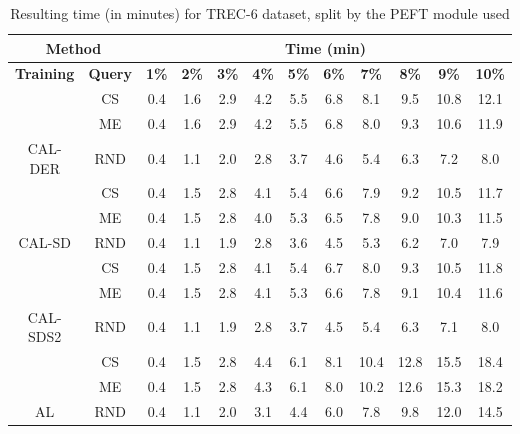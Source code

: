 \begin{table}[htbp]
\begin{subtable}{\linewidth}
\begin{tabular}{c|c|cccccccccc}
\toprule
\multicolumn{2}{c|}{\textbf{Method}} & \multicolumn{10}{c}{\textbf{Time (min)}} \\
\midrule
\textbf{Training} & \textbf{Query} & \textbf{1\%} & \textbf{2\%} & \textbf{3\%} & \textbf{4\%} & \textbf{5\%} & \textbf{6\%} & \textbf{7\%} & \textbf{8\%} & \textbf{9\%} & \textbf{10\%}\\
\midrule
 & CS & 0.4 & 1.6 & 2.9 & 4.2 & 5.5 & 6.8 & 8.1 & 9.5 & 10.8 & 12.1\\

 & ME & 0.4 & 1.6 & 2.9 & 4.2 & 5.5 & 6.8 & 8.0 & 9.3 & 10.6 & 11.9\\

\multirow{-3}{*}{\raggedright\arraybackslash CAL-DER} & RND & 0.4 & 1.1 & 2.0 & 2.8 & 3.7 & 4.6 & 5.4 & 6.3 & 7.2 & 8.0\\
\midrule
 & CS & 0.4 & 1.5 & 2.8 & 4.1 & 5.4 & 6.6 & 7.9 & 9.2 & 10.5 & 11.7\\

 & ME & 0.4 & 1.5 & 2.8 & 4.0 & 5.3 & 6.5 & 7.8 & 9.0 & 10.3 & 11.5\\

\multirow{-3}{*}{\raggedright\arraybackslash CAL-SD} & RND & 0.4 & 1.1 & 1.9 & 2.8 & 3.6 & 4.5 & 5.3 & 6.2 & 7.0 & 7.9\\
\midrule
 & CS & 0.4 & 1.5 & 2.8 & 4.1 & 5.4 & 6.7 & 8.0 & 9.3 & 10.5 & 11.8\\

 & ME & 0.4 & 1.5 & 2.8 & 4.1 & 5.3 & 6.6 & 7.8 & 9.1 & 10.4 & 11.6\\

\multirow{-3}{*}{\raggedright\arraybackslash CAL-SDS2} & RND & 0.4 & 1.1 & 1.9 & 2.8 & 3.7 & 4.5 & 5.4 & 6.3 & 7.1 & 8.0\\
\midrule
 & CS & 0.4 & 1.5 & 2.8 & 4.4 & 6.1 & 8.1 & 10.4 & 12.8 & 15.5 & 18.4\\

 & ME & 0.4 & 1.5 & 2.8 & 4.3 & 6.1 & 8.0 & 10.2 & 12.6 & 15.3 & 18.2\\

\multirow{-3}{*}{\raggedright\arraybackslash AL} & RND & 0.4 & 1.1 & 2.0 & 3.1 & 4.4 & 6.0 & 7.8 & 9.8 & 12.0 & 14.5\\
\bottomrule
\end{tabular}
\end{subtable}
\caption{Resulting time (in minutes) for TREC-6 dataset, split by the PEFT module used}
\label{tab:time_short_trec_10}
\end{table}
